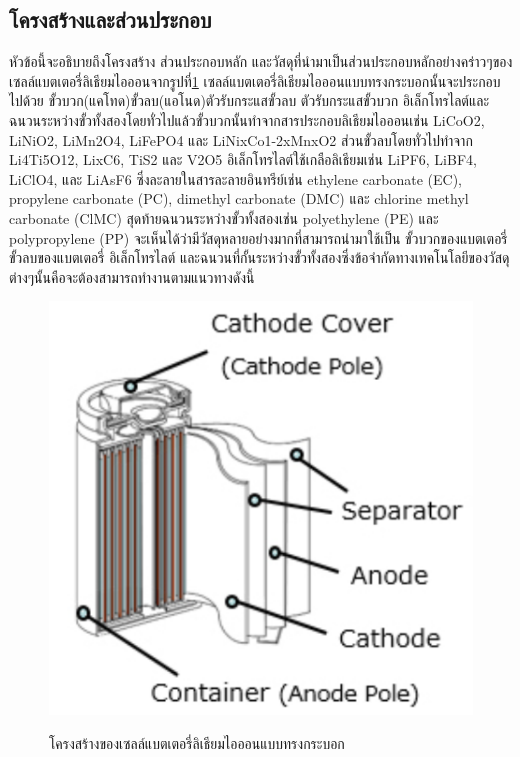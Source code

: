 \subsection{โครงสร้างและส่วนประกอบ}
หัวข้อนี้จะอธิบายถึงโครงสร้าง ส่วนประกอบหลัก และวัสดุที่นำมาเป็นส่วนประกอบหลักอย่างคร่าวๆของเซลล์แบตเตอรี่ลิเธียมไอออนจากรูปที่\ref{fig:Li-ion Structure} เซลล์แบตเตอรี่ลิเธียมไอออนแบบทรงกระบอกนั้นจะประกอบไปด้วย ขั้วบวก(แคโทด)ขั้วลบ(แอโนด)ตัวรับกระแสขั้วลบ ตัวรับกระแสขั้วบวก อิเล็กโทรไลต์และฉนวนระหว่างขั้วทั้งสองโดยทั่วไปแล้วขั้วบวกนั้นทำจากสารประกอบลิเธียมไอออนเช่น LiCoO2, LiNiO2, LiMn2O4, LiFePO4 และ LiNixCo1-2xMnxO2 ส่วนขั้วลบโดยทั่วไปทำจาก Li4Ti5O12, LixC6, TiS2 และ V2O5 อิเล็กโทรไลต์ใช้เกลือลิเธียมเช่น LiPF6, LiBF4, LiClO4, และ LiAsF6 ซึ่งละลายในสารละลายอินทรีย์เช่น ethylene carbonate (EC), propylene carbonate (PC), dimethyl carbonate (DMC) และ chlorine methyl carbonate (ClMC) สุดท้ายฉนวนระหว่างขั้วทั้งสองเช่น polyethylene (PE) และ polypropylene (PP) จะเห็นได้ว่ามีวัสดุหลายอย่างมากที่สามารถนำมาใช้เป็น ขั้วบวกของแบตเตอรี่ ขั้วลบของแบตเตอรี่ อิเล็กโทรไลต์ และฉนวนที่กั้นระหว่างขั้วทั้งสองซึ่งข้อจำกัดทางเทคโนโลยีของวัสดุต่างๆนั้นคือจะต้องสามารถทำงานตามแนวทางดังนี้
\begin{center}
	\begin{figure}[!h]
		\includegraphics[width=0.4\linewidth]{Chapters/img/Cyrinder_battery.pdf}
		\centering
		\captionsetup{justification=centering,margin=2cm}
		\caption{โครงสร้างของเซลล์แบตเตอรี่ลิเธียมไอออนแบบทรงกระบอก}
		\cite{panasonic}
		\label{fig:Li-ion Structure}
	\end{figure}
\end{center}
